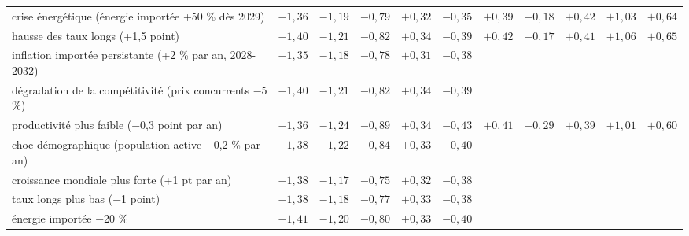 \begin{tabular}{p{4.8cm}rrrrrrrrrr}
crise énergétique (énergie importée +50 \% dès 2029) & $-1{,}36$ & $-1{,}19$ & $-0{,}79$ & $+0{,}32$ & $-0{,}35$ & $+0{,}39$ & $-0{,}18$ & $+0{,}42$ & $+1{,}03$ & $+0{,}64$\\
hausse des taux longs (+1,5 point) & $-1{,}40$ & $-1{,}21$ & $-0{,}82$ & $+0{,}34$ & $-0{,}39$ & $+0{,}42$ & $-0{,}17$ & $+0{,}41$ & $+1{,}06$ & $+0{,}65$\\
inflation importée persistante (+2 \% par an, 2028-2032) & $-1{,}35$ & $-1{,}18$ & $-0{,}78$ & $+0{,}31$ & $-0{,}38$ &  &  &  &  & \\
dégradation de la compétitivité (prix concurrents −5 \%) & $-1{,}40$ & $-1{,}21$ & $-0{,}82$ & $+0{,}34$ & $-0{,}39$ &  &  &  &  & \\
productivité plus faible (−0,3 point par an) & $-1{,}36$ & $-1{,}24$ & $-0{,}89$ & $+0{,}34$ & $-0{,}43$ & $+0{,}41$ & $-0{,}29$ & $+0{,}39$ & $+1{,}01$ & $+0{,}60$\\
choc démographique (population active −0,2 \% par an) & $-1{,}38$ & $-1{,}22$ & $-0{,}84$ & $+0{,}33$ & $-0{,}40$ &  &  &  &  & \\
croissance mondiale plus forte (+1 pt par an) & $-1{,}38$ & $-1{,}17$ & $-0{,}75$ & $+0{,}32$ & $-0{,}38$ &  &  &  &  & \\
taux longs plus bas (−1 point) & $-1{,}38$ & $-1{,}18$ & $-0{,}77$ & $+0{,}33$ & $-0{,}38$ &  &  &  &  & \\
énergie importée −20 \% & $-1{,}41$ & $-1{,}20$ & $-0{,}80$ & $+0{,}33$ & $-0{,}40$ &  &  &  &  & \\\bottomrule\end{tabular}